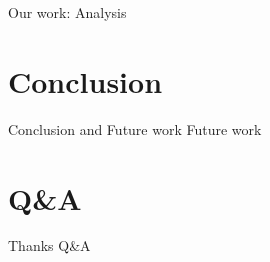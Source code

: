 \documentclass[compress]{beamer}
\begin{document}
  \begin{frame}{Our work: Analysis}
    
  \end{frame}
  
\section{Conclusion}
  \begin{frame}{Conclusion and Future work}
    Future work
  \end{frame}

\section{Q\&A}  
  \begin{frame}{}
    Thanks Q\&A
  \end{frame}
  
\end{document}
